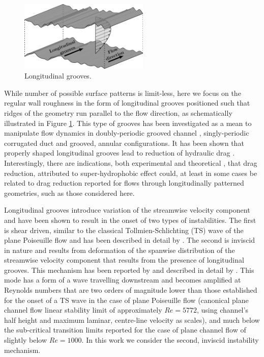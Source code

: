 \documentclass[lineno]{jfm}
\begin{document}

\begin{figure}
\centering
	\includegraphics[width=0.55\textwidth]{figure1.png}  
	\caption{Longitudinal grooves.}
	\label{fig:longitudinal_groove}
\end{figure}

While number of possible surface patterns is limit-less, here we focus on the 
regular wall roughness in the form of longitudinal grooves positioned such that ridges of the geometry run parallel to the flow direction, as schematically illustrated in Figure \ref{fig:longitudinal_groove}.
This type of grooves has been investigated as a mean to manipulate flow dynamics in doubly-periodic grooved channel \citep{Szumbar2007, mohammadi2014effects, Mohammadi2015, Nikesh2017, Gepner2020, Gepner2020b}, singly-periodic corrugated duct \citep{Nikesh2018, Pushenko2021} and grooved, annular \citep{moradi2019flow, moradi2019drag} configurations.
It has been shown that properly shaped longitudinal grooves lead to reduction of hydraulic drag \citep{Szumbar2011, szumbarski2011impact, mohammadi2015numerical, Ng2018, moradi2019drag}.
Interestingly, there are indications, both experimental \citep{Bolognesi2014,Kim2012} and theoretical \citep{crowdy2017},
that drag reduction, attributed to super-hydrophobic effect could, at least in some cases be related to drag reduction reported for flows through longitudinally patterned geometries, such as those considered here.

Longitudinal grooves introduce variation of the streamwise velocity component and have been shown to result in the onset of two types of instabilities.
The first is shear driven, similar to the classical Tollmien-Schlichting (TS) wave of the plane Poiseuille flow and has been described in detail by \citet{moradi2014stability}.
The second is inviscid in nature and results from deformation of the spanwise distribution of the streamwise velocity component that results from the presence of longitudinal grooves.
This mechanism has been reported by \citet{Szumbar2007} and described in detail by \citet{Mohammadi2015,Nikesh2017}.
This mode has a form of a wave travelling downstream and becomes amplified at Reynolds numbers that are two orders of magnitude lower than those established for the onset of a TS wave in the case of plane Poiseuille flow (canonical plane channel flow linear stability limit of approximately $Re=5772$, using channel's half height and maximum laminar, centre-line velocity as scales), and much below the sub-critical transition limits reported for the case of plane channel flow \citep{carlson1982flow, Gome2020} of slightly below $Re=1000$.
In this work we consider the second, inviscid instability mechanism.
\end{document}

